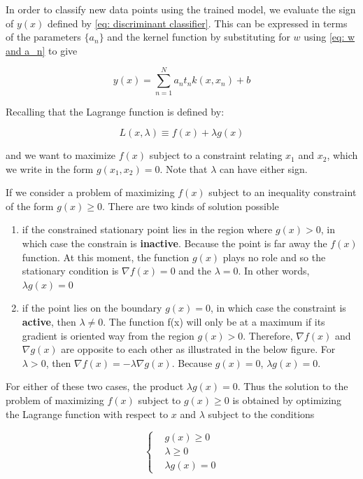 In order to classify new data points using the trained model, we evaluate the sign of $y(x)$ defined by \ref{eq: discriminant classifier}. This can be expressed in terms of the parameters $\{a_n\}$ and the kernel function by substituting for $w$ using \ref{eq: w and a_n} to give

\begin{equation}
    y(x) = \sum_{n=1}^{N} a_n t_n k(x, x_n) + b
\end{equation}

Recalling that the Lagrange function is defined by:

$$
    L(x, \lambda) \equiv f(x) + \lambda g(x)
$$

and we want to maximize $f(x)$ subject to a constraint relating $x_1$ and $x_2$, which we write in the form $g(x_1, x_2)=0$. 
Note that $\lambda$ can have either sign.

If we consider a problem of maximizing $f(x)$ subject to an inequality constraint of the form $g(x) \geq 0$. There are two kinds of solution possible

\begin{enumerate}
    \item if the constrained stationary point lies in the region where $g(x) > 0$, in which case the constrain is \textbf{inactive}. Because the point is far away the $f(x)$ function. At this moment, the function $g(x)$ plays no role and so the stationary condition is $\nabla f(x) = 0$ and the $\lambda = 0$. In other words, $\lambda g(x) = 0$
    \item if the point lies on the boundary $g(x) = 0$, in which case the constraint is \textbf{active}, then $\lambda \neq 0$. The function f(x) will only be at a maximum if its gradient is oriented way from the region $g(x) > 0$. Therefore, $\nabla f(x)$ and $\nabla g(x)$ are opposite to each other as illustrated in the below figure. For $\lambda > 0$, then $\nabla f(x) = - \lambda \nabla g(x)$. Because $g(x) = 0$, $\lambda g(x) = 0$.
\end{enumerate}
 
For either of these two cases, the product $\lambda g(x) = 0$. Thus the solution to the problem of maximizing $f(x)$ subject to $g(x) \geq 0$ is obtained by optimizing the Lagrange function with respect to $x$ and $\lambda$ subject to the conditions

\begin{equation}
  \left\{
    \begin{aligned}
      & g(x) \geq 0\\
      & \lambda \geq 0\\
      & \lambda g(x) = 0
    \end{aligned}
  \right.
\end{equation}
 
